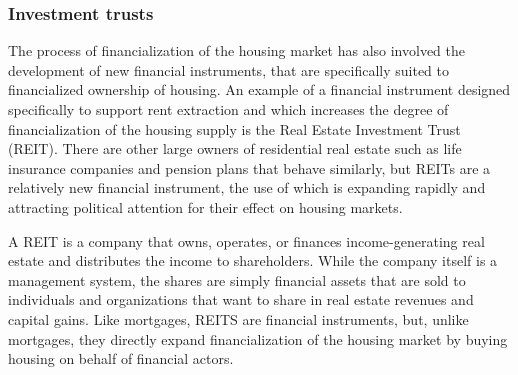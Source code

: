 

\subsubsection{Investment trusts}

The process of financialization of the housing market has also involved the development of new financial instruments, that are specifically suited to financialized ownership of housing. An example of a financial instrument designed specifically to support rent extraction and which increases the degree of financialization of the housing supply is the Real Estate Investment Trust (\gls{REIT}). There are other large owners of residential real estate such as life insurance companies and pension plans that behave similarly, but REITs are a relatively new financial instrument, the use of which is expanding rapidly and attracting political attention for their effect on housing markets.

A REIT is a company that owns, operates, or finances income-generating real estate and distributes the income to shareholders. While the company itself is a management system, the shares are simply financial assets that are sold to individuals and organizations that want to share in real estate revenues and capital gains. Like mortgages, REITS are financial instruments, but, unlike mortgages, they directly expand financialization of the housing market by buying housing on behalf of financial actors.

